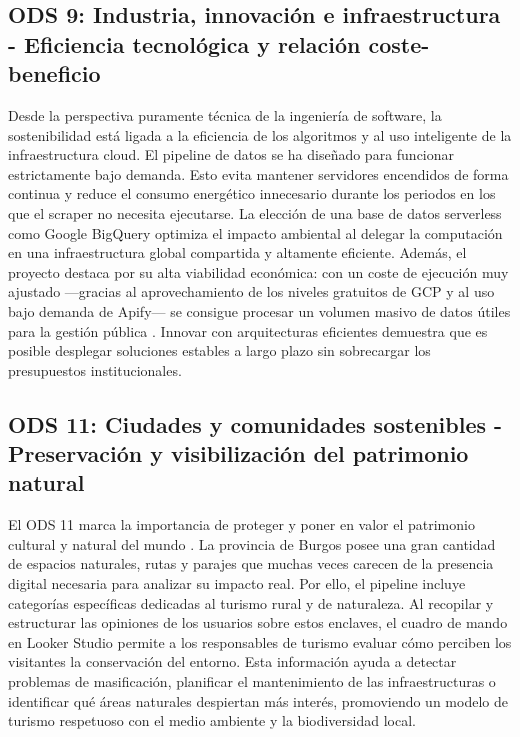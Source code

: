 \subsection{ODS 9: Industria, innovación e infraestructura - Eficiencia tecnológica y relación coste-beneficio}
Desde la perspectiva puramente técnica de la ingeniería de software, la sostenibilidad está ligada a la eficiencia de los algoritmos y al uso inteligente de la infraestructura cloud. El pipeline de datos se ha diseñado para funcionar estrictamente bajo demanda. Esto evita mantener servidores encendidos de forma continua y reduce el consumo energético innecesario durante los periodos en los que el scraper no necesita ejecutarse. La elección de una base de datos serverless como Google BigQuery optimiza el impacto ambiental al delegar la computación en una infraestructura global compartida y altamente eficiente. Además, el proyecto destaca por su alta viabilidad económica: con un coste de ejecución muy ajustado —gracias al aprovechamiento de los niveles gratuitos de GCP y al uso bajo demanda de Apify— se consigue procesar un volumen masivo de datos útiles para la gestión pública \cite{onu_ods9}. Innovar con arquitecturas eficientes demuestra que es posible desplegar soluciones estables a largo plazo sin sobrecargar los presupuestos institucionales.

\subsection{ODS 11: Ciudades y comunidades sostenibles - Preservación y visibilización del patrimonio natural}
El ODS 11 marca la importancia de proteger y poner en valor el patrimonio cultural y natural del mundo \cite{onu_ods11}. La provincia de Burgos posee una gran cantidad de espacios naturales, rutas y parajes que muchas veces carecen de la presencia digital necesaria para analizar su impacto real. Por ello, el pipeline incluye categorías específicas dedicadas al turismo rural y de naturaleza. Al recopilar y estructurar las opiniones de los usuarios sobre estos enclaves, el cuadro de mando en Looker Studio permite a los responsables de turismo evaluar cómo perciben los visitantes la conservación del entorno. Esta información ayuda a detectar problemas de masificación, planificar el mantenimiento de las infraestructuras o identificar qué áreas naturales despiertan más interés, promoviendo un modelo de turismo respetuoso con el medio ambiente y la biodiversidad local.

